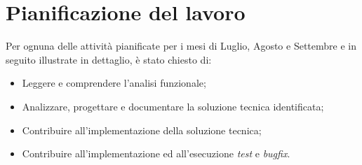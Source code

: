 \section{Pianificazione del lavoro}
\label{cap:pianificazione}
Per ognuna delle attività pianificate per i mesi di Luglio, Agosto e Settembre e in seguito illustrate in dettaglio, è stato chiesto di:
\begin{itemize}
	\item Leggere e comprendere l’analisi funzionale;
	\item Analizzare, progettare e documentare la soluzione tecnica identificata;
	\item Contribuire all’implementazione della soluzione tecnica;
	\item Contribuire all’implementazione ed all’esecuzione \emph{test} e \emph{bugfix}.
\end{itemize}

